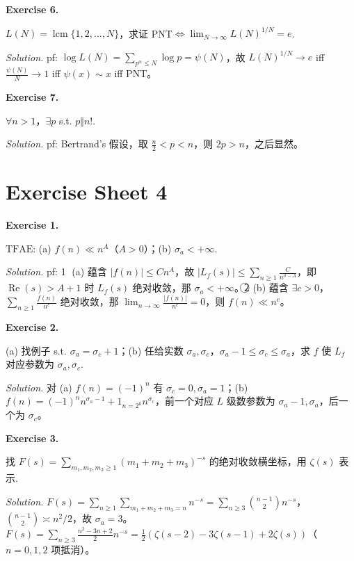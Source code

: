 \documentclass[
	colors = true,
	geometry = b5,
	fontsetup = font-setup-overleaf.tex,
	titlesetup = titles-setup.tex
]{AJbook}
\newenvironment{sheetexercise}[1]{%
	\par\medskip
	\noindent\textbf{Exercise #1.}\enspace
}{%
	\par\smallskip
}
\newenvironment{solution}{%
	\par\smallskip
	\noindent\textit{Solution.}\enspace
}{%
	\par\smallskip
}
\begin{document}
\begin{sheetexercise}{6}
$L(N)=\operatorname{lcm}\{1,2,\ldots,N\}$，求证 PNT$\Leftrightarrow\lim_{N\to\infty}L(N)^{1/N}=e$.
\end{sheetexercise}
\begin{solution}pf: $\log L(N)=\sum_{p^\alpha\leq N}\log p=\psi(N)$，故 $L(N)^{1/N}\to e$ iff $\frac{\psi(N)}N\to1$ iff $\psi(x)\sim x$ iff PNT。\end{solution}

\begin{sheetexercise}{7}
$\forall n>1$，$\exists p$ s.t. $p\Vert n!$.
\end{sheetexercise}
\begin{solution}pf: Bertrand's 假设，取 $\frac n2<p<n$，则 $2p>n$，之后显然。\end{solution}
\chapter{Exercise Sheet 4}
\begin{sheetexercise}{1}
$\mathrm{TFAE}$: (a) $f(n)\ll n^A$（$A>0$）；(b) $\sigma_a<+\infty$.
\end{sheetexercise}
\begin{solution}pf: \textcircled{\scriptsize 1} (a) 蕴含 $|f(n)|\leq Cn^A$，故 $|L_f(s)|\leq\sum_{n\geq1}\frac C{n^{\sigma-A}}$，即 $\operatorname{Re}(s)>A+1$ 时 $L_f(s)$ 绝对收敛，那 $\sigma_a<+\infty$。\textcircled{\scriptsize 2} (b) 蕴含 $\exists c>0$，$\sum_{n\geq1}\frac{f(n)}{n^c}$ 绝对收敛，那 $\lim_{n\to\infty}\frac{|f(n)|}{n^c}=0$，则 $f(n)\ll n^c$。\end{solution}

\begin{sheetexercise}{2}
(a) 找例子 s.t. $\sigma_a=\sigma_c+1$；(b) 任给实数 $\sigma_a,\sigma_c$，$\sigma_a-1\leq\sigma_c\leq\sigma_a$，求 $f$ 使 $L_f$ 对应参数为 $\sigma_a,\sigma_c$.
\end{sheetexercise}
\begin{solution}对 (a) $f(n)=(-1)^n$ 有 $\sigma_c=0,\sigma_a=1$；(b) $f(n)=(-1)^n n^{\sigma_a-1}+1_{n=2^k}n^{\sigma_c}$，前一个对应 $L$ 级数参数为 $\sigma_a-1,\sigma_a$，后一个为 $\sigma_c$。\end{solution}

\begin{sheetexercise}{3}
找 $F(s)=\sum_{m_1,m_2,m_3\geq1}(m_1+m_2+m_3)^{-s}$ 的绝对收敛横坐标，用 $\zeta(s)$ 表示.
\end{sheetexercise}
\begin{solution}$F(s)=\sum_{n\geq1}\sum_{m_1+m_2+m_3=n}n^{-s}=\sum_{n\geq3}\binom{n-1}2n^{-s}$，$\binom{n-1}2\asymp n^2/2$，故 $\sigma_a=3$。$F(s)=\sum_{n\geq3}\frac{n^2-3n+2}2n^{-s}=\frac12(\zeta(s-2)-3\zeta(s-1)+2\zeta(s))$（$n=0,1,2$ 项抵消）。\end{solution}
\end{document}
